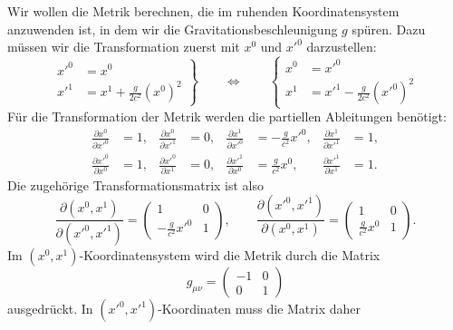 Wir wollen die Metrik berechnen, die im ruhenden Koordinatensystem
anzuwenden ist, in dem wir die Gravitationsbeschleunigung $g$ spüren. 
Dazu müssen wir die Transformation zuerst mit $x^0$ und $x'^0$ 
darzustellen:
\begin{equation}
\left.
\begin{aligned}
x'^0 &= x^0 \\
x'^1 &= x^1+\frac{g}{2c^2}(x^0)^2
\end{aligned}
\right\}
\qquad
\Leftrightarrow
\qquad
\left\{
\begin{aligned}
x^0 &= x'^0 \\
x^1 &= x'^1 - \frac{g}{2c^2}(x'^0)^2
\end{aligned}
\right.
\end{equation}
Für die Transformation der Metrik werden die partiellen Ableitungen
benötigt:
\begin{equation}
\begin{aligned}
\frac{\partial x^0}{\partial x'^0}&=1,
&
\frac{\partial x^0}{\partial x'^1}&=0,
&
\frac{\partial x^1}{\partial x'^0}&=-\frac{g}{c^2}x'^0,
&
\frac{\partial x^1}{\partial x'^1}&=1,
\\
\frac{\partial x'^0}{\partial x^0}&=1,
&
\frac{\partial x'^0}{\partial x^1}&=0,
&
\frac{\partial x'^1}{\partial x^0}&=\frac{g}{c^2}x^0,
&
\frac{\partial x'^1}{\partial x^1}&=1.
\end{aligned}
\end{equation}
Die zugehörige Transformationsmatrix ist also
\begin{equation}
\frac{\partial (x^0, x^1)}{\partial (x'^0, x'^1)}
=
\begin{pmatrix}
1&0\\
-\frac{g}{c^2}x'^0&1
\end{pmatrix},
\qquad
\frac{\partial (x'^0, x'^1)}{\partial (x^0, x^1)}
=
\begin{pmatrix}
1&0\\
\frac{g}{c^2}x^0&1
\end{pmatrix}.
\end{equation}
Im $(x^0,x^1)$-Koordinatensystem wird die Metrik durch die Matrix
\[
g_{\mu\nu}
=
\begin{pmatrix}-1&0\\0&1\end{pmatrix}
\]
ausgedrückt.
In $(x'^0,x'^1)$-Koordinaten muss die Matrix daher
